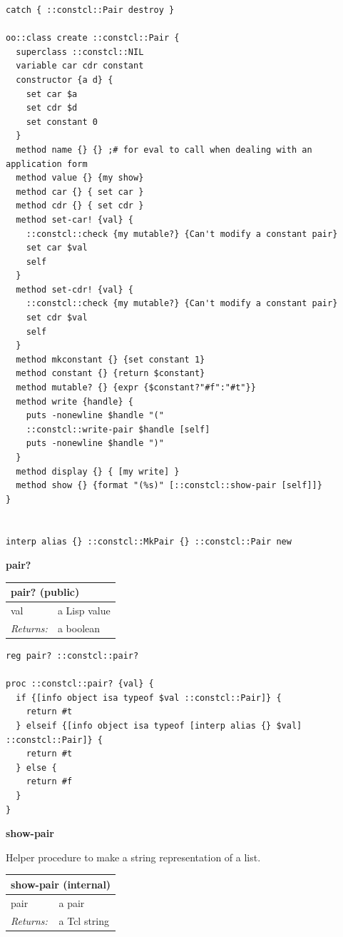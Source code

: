 \documentclass[twoside,9pt]{report}
\begin{document}
\noindent\makebox[\linewidth]{\rule{\linewidth}{0.4pt}}
\begin{lstlisting}
catch { ::constcl::Pair destroy }
 
oo::class create ::constcl::Pair {
  superclass ::constcl::NIL
  variable car cdr constant
  constructor {a d} {
    set car $a
    set cdr $d
    set constant 0
  }
  method name {} {} ;# for eval to call when dealing with an application form
  method value {} {my show}
  method car {} { set car }
  method cdr {} { set cdr }
  method set-car! {val} {
    ::constcl::check {my mutable?} {Can't modify a constant pair}
    set car $val
    self
  }
  method set-cdr! {val} {
    ::constcl::check {my mutable?} {Can't modify a constant pair}
    set cdr $val
    self
  }
  method mkconstant {} {set constant 1}
  method constant {} {return $constant}
  method mutable? {} {expr {$constant?"#f":"#t"}}
  method write {handle} {
    puts -nonewline $handle "("
    ::constcl::write-pair $handle [self]
    puts -nonewline $handle ")"
  }
  method display {} { [my write] }
  method show {} {format "(%s)" [::constcl::show-pair [self]]}
}
 
 
interp alias {} ::constcl::MkPair {} ::constcl::Pair new
\end{lstlisting}
\noindent\makebox[\linewidth]{\rule{\linewidth}{0.4pt}}

\textbf{pair?}

\begin{tabular}{ |l l| }
\hline
\multicolumn{2}{|l|}{pair? (public)} \\
\hline
val & a Lisp value \\
\textit{Returns:} & a boolean \\
\hline
\end{tabular}

\noindent\makebox[\linewidth]{\rule{\linewidth}{0.4pt}}
\begin{lstlisting}
reg pair? ::constcl::pair?
 
proc ::constcl::pair? {val} {
  if {[info object isa typeof $val ::constcl::Pair]} {
    return #t
  } elseif {[info object isa typeof [interp alias {} $val] ::constcl::Pair]} {
    return #t
  } else {
    return #f
  }
}
\end{lstlisting}
\noindent\makebox[\linewidth]{\rule{\linewidth}{0.4pt}}

\textbf{show-pair}


Helper procedure to make a string representation of a list.

\begin{tabular}{ |l l| }
\hline
\multicolumn{2}{|l|}{show-pair (internal)} \\
\hline
pair & a pair \\
\textit{Returns:} & a Tcl string \\
\hline
\end{tabular}
\end{document}
